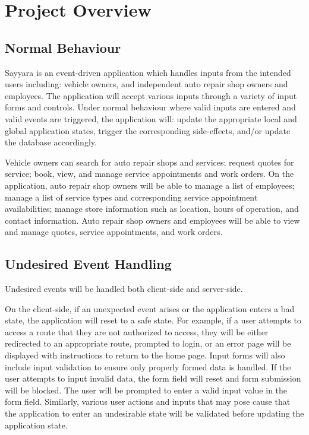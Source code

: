 \documentclass[12pt, titlepage]{article}
\begin{document}

\section{Project Overview}

\subsection{Normal Behaviour}
Sayyara is an event-driven application which handles inputs from the intended users including:
vehicle owners, and independent auto repair shop owners and employees. The application will accept
various inputs through a variety of input forms and controls. Under normal behaviour where valid
inputs are entered and valid events are triggered, the application will: update the appropriate
local and global application states, trigger the corresponding side-effects, and/or update the
database accordingly.

Vehicle owners can search for auto repair shops and services; request quotes for service; book,
view, and manage service appointments and work orders. On the application, auto repair shop owners
will be able to manage a list of employees; manage a list of service types and corresponding
service appointment availabilities; manage store information such as location, hours of operation,
and contact information. Auto repair shop owners and employees will be able to view and manage
quotes, service appointments, and work orders.

\subsection{Undesired Event Handling}

Undesired events will be handled both client-side and server-side.

On the client-side, if an unexpected event arises or the application enters a bad state, the
application will reset to a safe state. For example, if a user attempts to access a route that they
are not authorized to access, they will be either redirected to an appropriate route, prompted to
login, or an error page will be displayed with instructions to return to the home page. Input forms
will also include input validation to ensure only properly formed data is handled. If the user
attempts to input invalid data, the form field will reset and form submission will be blocked. The
user will be prompted to enter a valid input value in the form field. Similarly, various user
actions and inputs that may pose cause that the application to enter an undesirable state will be
validated before updating the application state.
\end{document}
